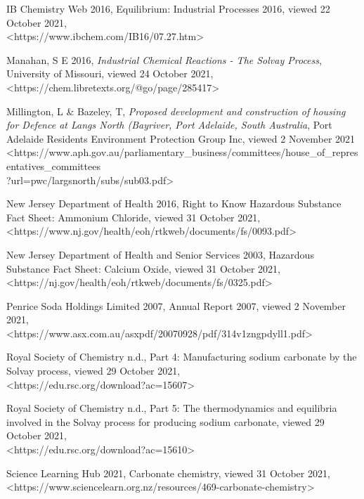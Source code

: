 \documentclass[12pt, a4paper]{article}
\begin{document}
IB Chemistry Web 2016, Equilibrium: Industrial Processes 2016, viewed 22 October 2021, \\ \textless{https://www.ibchem.com/IB16/07.27.htm}\textgreater

Manahan, S E 2016, \emph{Industrial Chemical Reactions - The Solvay Process}, University of Missouri, viewed 24 October 2021, \textless{https://chem.libretexts.org/@go/page/285417}\textgreater

Millington, L \& Bazeley, T, \emph{Proposed development and construction of housing for Defence at Langs North (Bayriver, Port Adelaide, South Australia}, Port Adelaide Residents Environment Protection Group Inc, viewed 2 November 2021 \\ \textless{https://www.aph.gov.au/parliamentary\_business/committees/house\_of\_representatives\_committees \\?url=pwc/largsnorth/subs/sub03.pdf}\textgreater

New Jersey Department of Health 2016, Right to Know Hazardous Substance Fact Sheet: Ammonium Chloride, viewed 31 October 2021, \\ \textless{https://www.nj.gov/health/eoh/rtkweb/documents/fs/0093.pdf}\textgreater

New Jersey Department of Health and Senior Services 2003, Hazardous Substance Fact Sheet: Calcium Oxide, viewed 31 October 2021, \\ \textless{https://nj.gov/health/eoh/rtkweb/documents/fs/0325.pdf}\textgreater

Penrice Soda Holdings Limited 2007, Annual Report 2007, viewed 2 November 2021, \\ \textless{https://www.asx.com.au/asxpdf/20070928/pdf/314v1zngpdyll1.pdf}\textgreater

Royal Society of Chemistry n.d., Part 4: Manufacturing sodium carbonate by the Solvay process, viewed 29 October 2021, \\ \textless{https://edu.rsc.org/download?ac=15607}\textgreater

Royal Society of Chemistry n.d., Part 5: The thermodynamics and equilibria involved in the Solvay process for producing sodium carbonate, viewed 29 October 2021, \\ \textless{https://edu.rsc.org/download?ac=15610}\textgreater

Science Learning Hub 2021, Carbonate chemistry, viewed 31 October 2021, \\ \textless{https://www.sciencelearn.org.nz/resources/469-carbonate-chemistry}\textgreater
\end{document}
